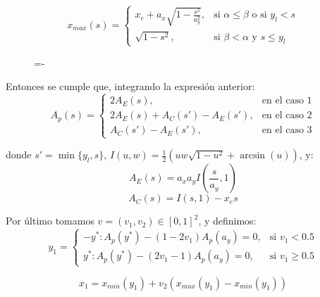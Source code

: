 \[ x_{max}(s) = 
   \begin{cases} 
       x_e+a_x\sqrt{1-\frac{s^2}{a_y^2}},  & \text{si $\alpha\leq\beta$ o si $y_l<s$} \\
       \sqrt{1-s^2}, & \text{si $\beta < \alpha$ y $s\leq y_l$}
   \end{cases}
\]

\begin{figure}[h]
  \lineskip=-\fboxrule
\end{figure}

Entonces se cumple que, integrando la expresión anterior:
\[ A_p(s) = 
   \begin{cases} 
       2A_E(s),  & \text{en el caso 1} \\
       2A_E(s) + A_C(s') - A_E(s'),  & \text{en el caso 2} \\
       A_C(s') - A_E(s'),  & \text{en el caso 3} 
   \end{cases}
\]

donde $s'=\min\{y_l,s\}$, $I(u,w) = \frac{1}{2}(uw\sqrt{1-u^2} + \arcsin(u))$, y:
$$A_E(s) = a_xa_yI(\frac{s}{a_y},1)$$
$$A_C(s) = I(s,1)-x_es$$

Por último tomamos $v=(v_1,v_2)\in[0,1]^2$, y definimos:
\[ y_1 = 
   \begin{cases} 
      -y^*: A_p(y^*)-(1-2v_1)A_p(a_y)=0,  & \text{si $v_1<0.5$} \\
      y^*:  A_p(y^*)-(2v_1-1)A_p(a_y)=0,  & \text{si $v_1\geq 0.5$}
   \end{cases}
\]

$$x_1 = x_{min}(y_1) + v_2 (x_{max}(y_1) - x_{min}(y_1))$$

